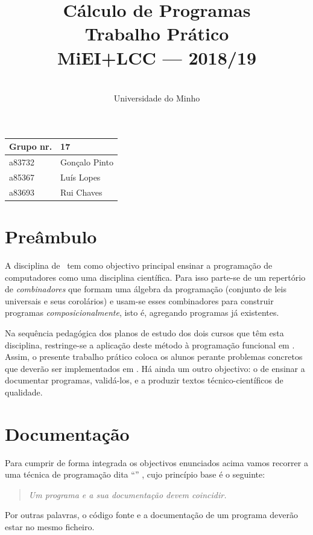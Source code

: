 \documentclass[a4paper]{article}
\title{
       	    Cálculo de Programas
\\
       	Trabalho Prático
\\
       	MiEI+LCC --- 2018/19
}
\author{
       	\dium
\\
       	Universidade do Minho
}
\date\mydate
\begin{document}
\maketitle

\begin{center}\large
\begin{tabular}{ll}
\textbf{Grupo} nr. & 17
\\\hline
a83732 & Gonçalo Pinto	
\\
a85367 & Luís Lopes
\\
a83693 & Rui Chaves
\end{tabular}
\end{center}

\section{Preâmbulo}

A disciplina de \CP\ tem como objectivo principal ensinar
a progra\-mação de computadores como uma disciplina científica. Para isso
parte-se de um repertório de \emph{combinadores} que formam uma álgebra da
programação (conjunto de leis universais e seus corolários) e usam-se esses
combinadores para construir programas \emph{composicionalmente}, isto é,
agregando programas já existentes.
  
Na sequência pedagógica dos planos de estudo dos dois cursos que têm
esta disciplina, restringe-se a aplicação deste método à programação
funcional em \Haskell. Assim, o presente trabalho prático coloca os
alunos perante problemas concretos que deverão ser implementados em
\Haskell.  Há ainda um outro objectivo: o de ensinar a documentar
programas, validá-los, e a produzir textos técnico-científicos de
qualidade.

\section{Documentação} Para cumprir de forma integrada os objectivos
enunciados acima vamos recorrer a uma técnica de programa\-ção dita
``'' \cite{Kn92}, cujo princípio base é o seguinte:
\begin{quote}\em Um programa e a sua documentação devem coincidir.
\end{quote} Por outras palavras, o código fonte e a documentação de um
programa deverão estar no mesmo ficheiro.
\end{document}
